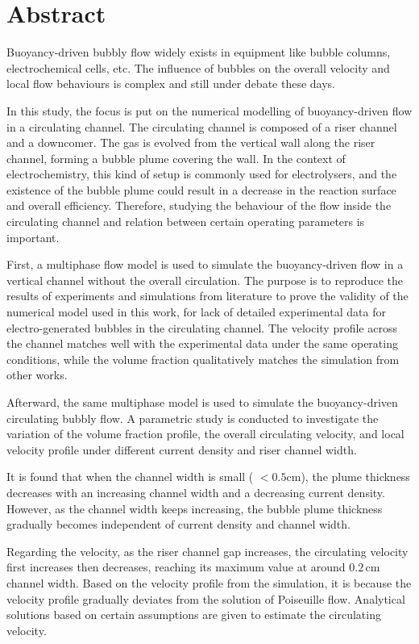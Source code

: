 \chapter*{Abstract}

Buoyancy-driven bubbly flow widely exists in equipment like bubble columns, electrochemical cells, etc. The influence of bubbles on the overall velocity and local flow behaviours is complex and still under debate these days. 

In this study, the focus is put on the numerical modelling of buoyancy-driven flow in a circulating channel. The circulating channel is composed of a riser channel and a downcomer. The gas is evolved from the vertical wall along the riser channel, forming a bubble plume covering the wall. In the context of electrochemistry, this kind of setup is commonly used for electrolysers, and the existence of the bubble plume could result in a decrease in the reaction surface and overall efficiency. Therefore, studying the behaviour of the flow inside the circulating channel and relation between certain operating parameters is important.

First, a multiphase flow model is used to simulate the buoyancy-driven flow in a vertical channel without the overall circulation. The purpose is to reproduce the results of experiments and simulations from literature to prove the validity of the numerical model used in this work, for lack of detailed experimental data for electro-generated bubbles in the circulating channel. The velocity profile across the channel matches well with the experimental data under the same operating conditions, while the volume fraction qualitatively matches the simulation from other works.

Afterward, the same multiphase model is used to simulate the buoyancy-driven circulating bubbly flow. A parametric study is conducted to investigate the variation of the volume fraction profile, the overall circulating velocity, and local velocity profile under different current density and riser channel width. 

It is found that when the channel width is small ( $< 0.5 \mathrm{cm}$), the plume thickness decreases with an increasing channel width and a decreasing current density. However, as the channel width keeps increasing, the bubble plume thickness gradually becomes independent of current density and channel width. 

Regarding the velocity, as the riser channel gap increases, the circulating velocity first increases then decreases, reaching its maximum value at around $0.2 \, \mathrm{cm}$ channel width. Based on the velocity profile from the simulation, it is because the velocity profile gradually deviates from the solution of Poiseuille flow. Analytical solutions based on certain assumptions are given to estimate the circulating velocity.